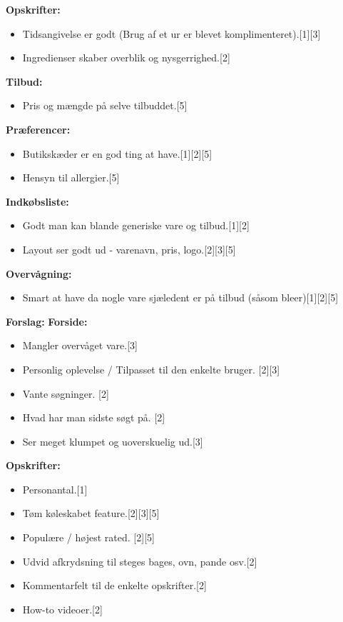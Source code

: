 		\textbf{Opskrifter:}
	\begin{itemize}
		\item Tidsangivelse er godt (Brug af et ur er blevet komplimenteret).{[}1{]}{[}3{]}
		\item Ingredienser skaber overblik og nysgerrighed.{[}2{]}
	\end{itemize}
		\textbf{Tilbud:}
	\begin{itemize}
		\item Pris og mængde på selve tilbuddet.{[}5{]}
	\end{itemize}
		\textbf{Præferencer:}
	\begin{itemize}
		\item Butikskæder er en god ting at have.{[}1{]}{[}2{]}{[}5{]}
		\item Hensyn til allergier.{[}5{]}
	\end{itemize}
		\textbf{Indkøbsliste:}
	\begin{itemize}
		\item Godt man kan blande generiske vare og tilbud.{[}1{]}{[}2{]}
		\item Layout ser godt ud - varenavn, pris, logo.{[}2{]}{[}3{]}{[}5{]}
	\end{itemize}
		\textbf{Overvågning:}
	\begin{itemize}
		\item Smart at have da nogle vare sjæledent er på tilbud (såsom bleer){[}1{]}{[}2{]}{[}5{]}
	\end{itemize}
\textbf{Forslag:}
		\textbf{Forside:}
	\begin{itemize}
		\item Mangler overvåget vare.{[}3{]}
		\item Personlig oplevelse / Tilpasset til den enkelte bruger. {[}2{]}{[}3{]}
		\item Vante søgninger. {[}2{]}
		\item Hvad har man sidste søgt på. {[}2{]}
		\item Ser meget klumpet og uoverskuelig ud.{[}3{]}
	\end{itemize}
		\textbf{Opskrifter:}
	\begin{itemize}
		\item Personantal.{[}1{]}
		\item Tøm køleskabet feature.{[}2{]}{[}3{]}{[}5{]}
		\item Populære / højest rated. {[}2{]}{[}5{]}
		\item Udvid afkrydsning til steges bages, ovn, pande osv.{[}2{]}
		\item Kommentarfelt til de enkelte opskrifter.{[}2{]}
		\item How-to videoer.{[}2{]}
	\end{itemize}
